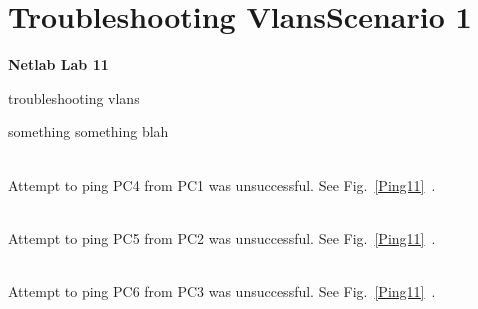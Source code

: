 \documentclass[../EngineeringJournal_CDavis.tex]{subfiles}
\begin{document}

\chapter[Troubleshooting Vlan]{Troubleshooting Vlans\linebreak[1] Scenario 1
\hspace*{\fill February 29, 2020}}
\noindent\textbf{{Netlab Lab 11} }                             


\hspace{0.2cm}
\begin{tcolorbox}[width=6.3in]
\scriptsize 
troubleshooting vlans
  \begin{outline}
    \1 something something blah
  \end{outline}
\end{tcolorbox}
\hspace{0.2cm}
\normalsize  
  
\clearpage


\\Attempt to ping PC4 from PC1 was unsuccessful. See
Fig.~\ref{Ping11}~. 

\noindent{}
\\Attempt to ping PC5 from PC2 was unsuccessful. See
Fig.~\ref{Ping11}~. 

\noindent{}
\\Attempt to ping PC6 from PC3 was unsuccessful. See
Fig.~\ref{Ping11}~. 
\end{document}
